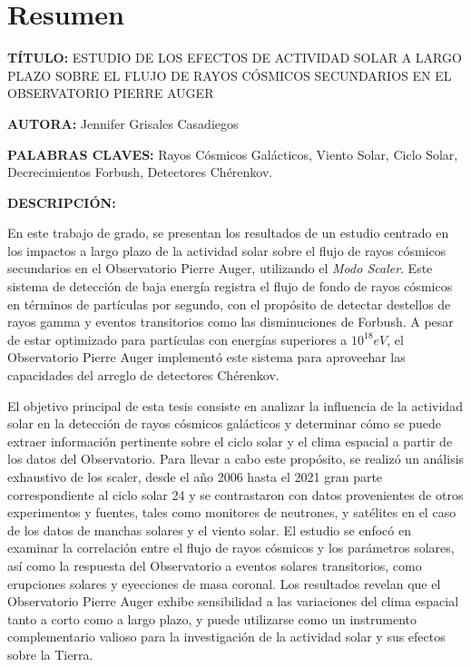 \newpage
\chapter*{Resumen}
\label{sec:resum}
\footnotesize{
\noindent\textbf{TÍTULO:}  ESTUDIO DE LOS EFECTOS DE ACTIVIDAD SOLAR A LARGO PLAZO
SOBRE EL FLUJO DE RAYOS CÓSMICOS SECUNDARIOS EN EL OBSERVATORIO PIERRE AUGER

\noindent\textbf{AUTORA:} Jennifer Grisales Casadiegos

\noindent\textbf{PALABRAS CLAVES: } Rayos Cósmicos Galácticos, Viento Solar, Ciclo Solar, Decrecimientos Forbush, Detectores Chérenkov.

\noindent \textbf{DESCRIPCIÓN: }

En este trabajo de grado, se presentan los resultados de un estudio centrado en los impactos a largo plazo de la actividad solar sobre el flujo de rayos cósmicos secundarios en el Observatorio Pierre Auger, utilizando el \textit{Modo Scaler}. Este sistema de detección de baja energía registra el flujo de fondo de rayos cósmicos en términos de partículas por segundo, con el propósito de detectar destellos de rayos gamma y eventos transitorios como las disminuciones de Forbush. A pesar de estar optimizado para partículas con energías superiores a $10^{18}eV$, el Observatorio Pierre Auger implementó este sistema para aprovechar las capacidades del arreglo de detectores Chérenkov.

El objetivo principal de esta tesis consiste en analizar la influencia de la actividad solar en la detección de rayos cósmicos galácticos y determinar cómo se puede extraer información pertinente sobre el ciclo solar y el clima espacial a partir de los datos del Observatorio. Para llevar a cabo este propósito, se realizó un análisis exhaustivo de los scaler, desde el año 2006 hasta el 2021 gran parte correspondiente al ciclo solar 24 y se contrastaron con datos provenientes de otros experimentos y fuentes, tales como monitores de neutrones, y satélites en el caso de los datos de manchas solares y el viento solar. El estudio se enfocó en examinar la correlación entre el flujo de rayos cósmicos y los parámetros solares, así como la respuesta del Observatorio a eventos solares transitorios, como erupciones solares y eyecciones de masa coronal. Los resultados revelan que el Observatorio Pierre Auger exhibe sensibilidad a las variaciones del clima espacial tanto a corto como a largo plazo, y puede utilizarse como un instrumento complementario valioso para la investigación de la actividad solar y sus efectos sobre la Tierra.
}\normalsize
\clearpage